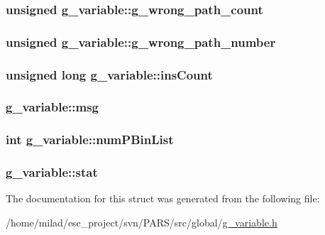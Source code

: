 \label{structg__variable_aeeef678f78f34f8743dc14c035ef56dd}
\hypertarget{structg__variable_a56cbb365fc7e39e093326334864e243a}{
\subsubsection[{g\_\-wrong\_\-path\_\-count}]{\setlength{\rightskip}{0pt plus 5cm}unsigned {\bf g\_\-variable::g\_\-wrong\_\-path\_\-count}}}
\label{structg__variable_a56cbb365fc7e39e093326334864e243a}
\hypertarget{structg__variable_adcc07b62ed94dbd9dc61ad8ca8b366a1}{
\subsubsection[{g\_\-wrong\_\-path\_\-number}]{\setlength{\rightskip}{0pt plus 5cm}unsigned {\bf g\_\-variable::g\_\-wrong\_\-path\_\-number}}}
\label{structg__variable_adcc07b62ed94dbd9dc61ad8ca8b366a1}
\hypertarget{structg__variable_a4740d9b4ca63320866b2eda4bba01b86}{
\subsubsection[{insCount}]{\setlength{\rightskip}{0pt plus 5cm}unsigned long {\bf g\_\-variable::insCount}}}
\label{structg__variable_a4740d9b4ca63320866b2eda4bba01b86}
\hypertarget{structg__variable_a59153de8e5186183f6a85ab0ae4e44c0}{
\subsubsection[{msg}]{ {\bf g\_\-variable::msg}}}
\label{structg__variable_a59153de8e5186183f6a85ab0ae4e44c0}
\hypertarget{structg__variable_a1b0b5933340788334ca1884e1e63707e}{
\subsubsection[{numPBinList}]{\setlength{\rightskip}{0pt plus 5cm}int {\bf g\_\-variable::numPBinList}}}
\label{structg__variable_a1b0b5933340788334ca1884e1e63707e}
\hypertarget{structg__variable_a548b9947f5c28cff1174da06598b4903}{
\subsubsection[{stat}]{ {\bf g\_\-variable::stat}}}
\label{structg__variable_a548b9947f5c28cff1174da06598b4903}


The documentation for this struct was generated from the following file:\begin{DoxyCompactItemize}
\item 
/home/milad/esc\_\-project/svn/PARS/src/global/\hyperlink{g__variable_8h}{g\_\-variable.h}\end{DoxyCompactItemize}
